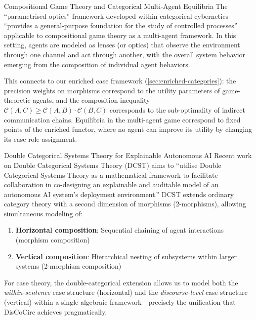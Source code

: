 \documentclass[
  ignorenonframetext,
]{beamer}
\providecommand{\tightlist}{%
  \setlength{\itemsep}{0pt}\setlength{\parskip}{0pt}}
\begin{document}
\begin{frame}{Compositional Game Theory and Categorical Multi-Agent
Equilibria}
\protect{}\label{compositional-game-theory-and-categorical-multi-agent-equilibria}
The ``parametrised optics'' framework developed within categorical
cybernetics ``provides a general-purpose foundation for the study of
controlled processes'' applicable to compositional game theory as a
multi-agent framework. In this setting, agents are modeled as lenses (or
optics) that observe the environment through one channel and act through
another, with the overall system behavior emerging from the composition
of individual agent behaviors.

This connects to our enriched case framework
(\autoref{sec:enriched-categories}): the precision weights on morphisms
correspond to the utility parameters of game-theoretic agents, and the
composition inequality
\(\mathcal{C}(A,C) \geq \mathcal{C}(A,B) \cdot \mathcal{C}(B,C)\)
corresponds to the sub-optimality of indirect communication chains.
Equilibria in the multi-agent game correspond to fixed points of the
enriched functor, where no agent can improve its utility by changing its
case-role assignment.
\end{frame}

\begin{frame}{Double Categorical Systems Theory for Explainable
Autonomous AI}
\protect{}\label{double-categorical-systems-theory-for-explainable-autonomous-ai}
Recent work on Double Categorical Systems Theory (DCST) aims to
``utilise Double Categorical Systems Theory as a mathematical framework
to facilitate collaboration in co-designing an explainable and auditable
model of an autonomous AI system's deployment environment.'' DCST
extends ordinary category theory with a second dimension of morphisms
(2-morphisms), allowing simultaneous modeling of:

\begin{enumerate}
\tightlist
\item
  \textbf{Horizontal composition}: Sequential chaining of agent
  interactions (morphism composition)
\item
  \textbf{Vertical composition}: Hierarchical nesting of subsystems
  within larger systems (2-morphism composition)
\end{enumerate}

For case theory, the double-categorical extension allows us to model
both the \emph{within-sentence} case structure (horizontal) and the
\emph{discourse-level} case structure (vertical) within a single
algebraic framework---precisely the unification that DisCoCirc achieves
pragmatically.
\end{frame}
\end{document}
